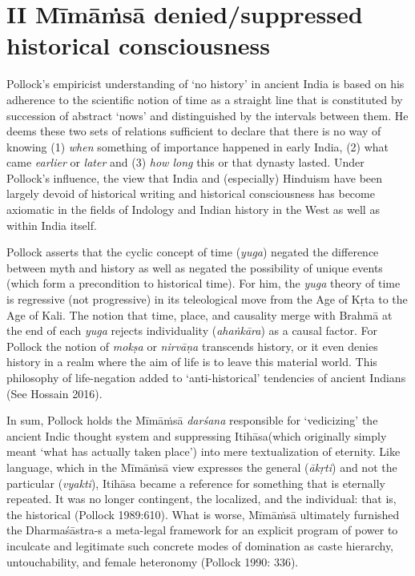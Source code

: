 \section*{II Mīmāṁsā denied/suppressed historical consciousness}

Pollock’s empiricist understanding of ‘no history’ in ancient India is based on his adherence to the scientific notion of time as a straight line that is constituted by succession of abstract ‘nows’ and distinguished by the intervals between them. He deems these two sets of relations sufficient to declare that there is no way of knowing (1) \textit{when} something of importance happened in early India, (2) what came \textit{earlier }or \textit{later} and (3) \textit{how long} this or that dynasty lasted. Under Pollock’s influence, the view that India and (especially) Hinduism have been largely devoid of historical writing and historical consciousness has become axiomatic in the fields of Indology and Indian history in the West as well as within India itself.

Pollock asserts that the cyclic concept of time (\textit{yuga}) negated the difference between myth and history as well as negated the possibility of unique events (which form a precondition to historical time). For him, the \textit{yuga} theory of time is regressive (not progressive) in its teleological move from the Age of Kṛta to the Age of Kali. The notion that time, place, and causality merge with Brahmā at the end of each \textit{yuga} rejects individuality (\textit{ahaṅkāra}) as a causal factor. For Pollock the notion of \textit{mokṣa} or \textit{nirvāṇa} transcends history, or it even denies history in a realm where the aim of life is to leave this material world. This philosophy of life-negation added to ‘anti-historical’ tendencies of ancient Indians (See Hossain 2016).

In sum, Pollock holds the Mīmāṁsā \textit{darśana} responsible for ‘vedicizing’ the ancient Indic thought system and suppressing Itihāsa(which originally simply meant ‘what has actually taken place’) into mere textualization of eternity. Like language, which in the Mīmāṁsā view expresses the general (\textit{ākṛti}) and not the particular (\textit{vyakti}), Itihāsa became a reference for something that is eternally repeated. It was no longer contingent, the localized, and the individual: that is, the historical (Pollock 1989:610). What is worse, Mīmāṁsā ultimately furnished the Dharmaśāstra-s a meta-legal framework for an explicit program of power to inculcate and legitimate such concrete modes of domination as caste hierarchy, untouchability, and female heteronomy (Pollock 1990: 336).


